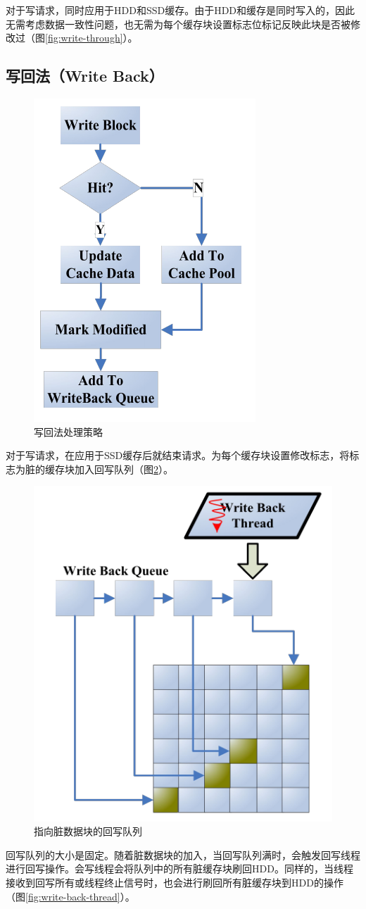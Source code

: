 对于写请求，同时应用于HDD和SSD缓存。由于HDD和缓存是同时写入的，因此无需考虑数据一致性问题，也无需为每个缓存块设置标志位标记反映此块是否被修改过（图\ref{fig:write-through}）。

\subsection{写回法（Write Back）}
\begin{figure}
\centering
\includegraphics[width=0.4\linewidth]{./graph/write-back}
\caption{写回法处理策略}
\label{fig:write-back}
\end{figure}

对于写请求，在应用于SSD缓存后就结束请求。为每个缓存块设置修改标志，将标志为脏的缓存块加入回写队列（图\ref{fig:write-back-queue}）。

\begin{figure}
\centering
\includegraphics[width=0.4\linewidth]{./graph/write-back-queue}
\caption{指向脏数据块的回写队列}
\label{fig:write-back-queue}
\end{figure}

回写队列的大小是固定。随着脏数据块的加入，当回写队列满时，会触发回写线程进行回写操作。会写线程会将队列中的所有脏缓存块刷回HDD。同样的，当线程接收到回写所有或线程终止信号时，也会进行刷回所有脏缓存块到HDD的操作（图\ref{fig:write-back-thread}）。

